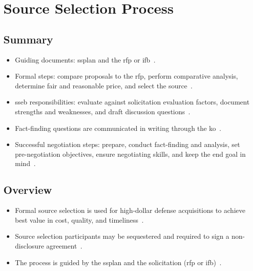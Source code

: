 \documentclass[../main.tex]{subfiles}
\begin{document}

\section{Source Selection Process}

\subsection{Summary}
\begin{itemize}
  \item Guiding documents: \ac{ssplan} and the \ac{rfp} or \ac{ifb}~\autocite{edo-3-2-3-source-selection-2025,DoD-Source-Selection-Procedures-2022,FAR-15-303-Responsibilities,FAR-15-304-Evaluation-Factors}.
  \item Formal steps: compare proposals to the \ac{rfp}, perform comparative analysis, determine fair and reasonable price, and select the source~\autocite{edo-3-2-3-source-selection-2025,FAR-15-305-Proposal-Evaluation,FAR-15-308-Source-Selection-Decision}.
  \item \ac{sseb} responsibilities: evaluate against solicitation evaluation factors, document strengths and weaknesses, and draft discussion questions~\autocite{edo-3-2-3-source-selection-2025,DoD-Source-Selection-Procedures-2022,FAR-15-305-Proposal-Evaluation,FAR-15-306-Exchanges}.
  \item Fact-finding questions are communicated in writing through the \ac{ko}~\autocite{edo-3-2-3-source-selection-2025,FAR-15-303-Responsibilities,FAR-15-306-Exchanges}.
  \item Successful negotiation steps: prepare, conduct fact-finding and analysis, set pre-negotiation objectives, ensure negotiating skills, and keep the end goal in mind~\autocite{edo-3-2-3-source-selection-2025}.
\end{itemize}

\subsection{Overview}
\begin{itemize}
  \item Formal source selection is used for high-dollar defense acquisitions to achieve best value in cost, quality, and timeliness~\autocite{edo-3-2-3-source-selection-2025,DoD-Source-Selection-Procedures-2022,FAR-15-101-Best-Value}.
  \item Source selection participants may be sequestered and required to sign a non-disclosure agreement~\autocite{edo-3-2-3-source-selection-2025}.
  \item The process is guided by the \ac{ssplan} and the solicitation (\ac{rfp} or \ac{ifb})~\autocite{edo-3-2-3-source-selection-2025,DoD-Source-Selection-Procedures-2022,FAR-15-303-Responsibilities,FAR-15-304-Evaluation-Factors}.
\end{itemize}
\end{document}
